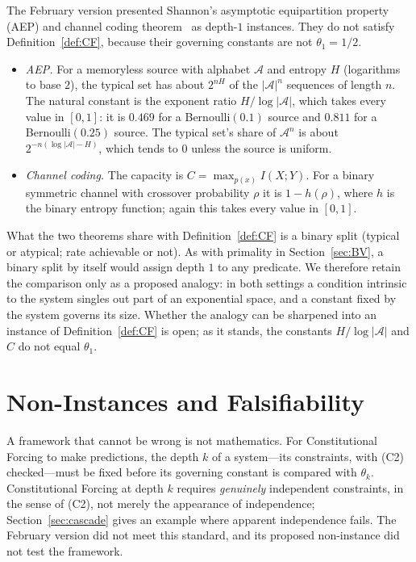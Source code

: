 \documentclass[12pt]{amsart}
\theoremstyle{plain}
\theoremstyle{definition}
\theoremstyle{remark}
\newcommand{\thetak}{\theta_k}
\begin{document}
The February version presented Shannon's asymptotic equipartition property
(AEP) and channel coding theorem~\cite{Shannon1948} as depth-$1$ instances. They
do not satisfy Definition~\ref{def:CF}, because their governing constants are
not $\theta_1 = 1/2$.
\begin{itemize}
  \item \emph{AEP.} For a memoryless source with alphabet $\mathcal{A}$ and
    entropy $H$ (logarithms to base $2$), the typical set has about $2^{nH}$
    of the $|\mathcal{A}|^n$ sequences of length $n$. The natural constant is
    the exponent ratio $H/\log|\mathcal{A}|$, which takes every value in
    $[0,1]$: it is $0.469$ for a Bernoulli$(0.1)$ source and $0.811$ for a
    Bernoulli$(0.25)$ source. The typical set's share of $\mathcal{A}^n$ is
    about $2^{-n(\log|\mathcal{A}| - H)}$, which tends to $0$ unless the source
    is uniform.
  \item \emph{Channel coding.} The capacity is $C = \max_{p(x)} I(X;Y)$. For a
    binary symmetric channel with crossover probability $\rho$ it is
    $1 - h(\rho)$, where $h$ is the binary entropy function; again this takes
    every value in $[0,1]$.
\end{itemize}
What the two theorems share with Definition~\ref{def:CF} is a binary split
(typical or atypical; rate achievable or not). As with primality in
Section~\ref{sec:BV}, a binary split by itself would assign depth $1$ to any
predicate. We therefore retain the comparison only as a proposed analogy: in
both settings a condition intrinsic to the system singles out part of an
exponential space, and a constant fixed by the system governs its size.
Whether the analogy can be sharpened into an instance of
Definition~\ref{def:CF} is open; as it stands, the constants
$H/\log|\mathcal{A}|$ and $C$ do not equal $\theta_1$.

\section{Non-Instances and Falsifiability}
\label{sec:noninstances}

A framework that cannot be wrong is not mathematics. For Constitutional
Forcing to make predictions, the depth $k$ of a system---its constraints, with
(C2) checked---must be fixed before its governing constant is compared with
$\thetak$. Constitutional Forcing at depth $k$ requires \emph{genuinely}
independent constraints, in the sense of (C2), not merely the appearance of
independence; Section~\ref{sec:cascade} gives an example where apparent
independence fails. The February version did not meet this standard, and its
proposed non-instance did not test the framework.
\end{document}
